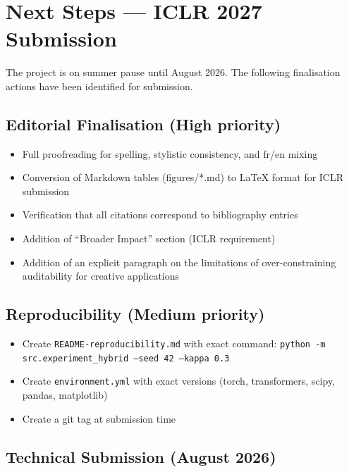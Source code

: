 \documentclass[11pt,a4paper]{article}
\theoremstyle{plain}
\begin{document}
\section{Next Steps --- ICLR 2027 Submission}

The project is on summer pause until August 2026. The following finalisation actions
have been identified for submission.

\subsection{Editorial Finalisation (High priority)}

\begin{itemize}[leftmargin=*]
\item Full proofreading for spelling, stylistic consistency, and fr/en mixing
\item Conversion of Markdown tables (figures/*.md) to \LaTeX{} format for ICLR submission
\item Verification that all citations correspond to bibliography entries
\item Addition of ``Broader Impact'' section (ICLR requirement)
\item Addition of an explicit paragraph on the limitations of over-constraining auditability for creative applications
\end{itemize}

\subsection{Reproducibility (Medium priority)}

\begin{itemize}[leftmargin=*]
\item Create \texttt{README-reproducibility.md} with exact command: \texttt{python -m src.experiment\_hybrid --seed 42 --kappa 0.3}
\item Create \texttt{environment.yml} with exact versions (torch, transformers, scipy, pandas, matplotlib)
\item Create a git tag at submission time
\end{itemize}

\subsection{Technical Submission (August 2026)}
\end{document}
